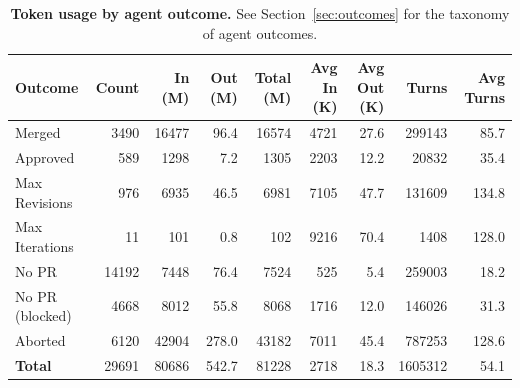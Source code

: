 \begin{table}[tbp]
\centering
\begin{tabular}{lrrrrrrrr}
\toprule
\textbf{Outcome} & \textbf{Count} & \textbf{In (M)} & \textbf{Out (M)} & \textbf{Total (M)} & \textbf{Avg In (K)} & \textbf{Avg Out (K)} & \textbf{Turns} & \textbf{Avg Turns} \\
\midrule
Merged & 3490 & 16477 & 96.4 & 16574 & 4721 & 27.6 & 299143 & 85.7 \\
Approved & 589 & 1298 & 7.2 & 1305 & 2203 & 12.2 & 20832 & 35.4 \\
Max Revisions & 976 & 6935 & 46.5 & 6981 & 7105 & 47.7 & 131609 & 134.8 \\
Max Iterations & 11 & 101 & 0.8 & 102 & 9216 & 70.4 & 1408 & 128.0 \\
No PR & 14192 & 7448 & 76.4 & 7524 & 525 & 5.4 & 259003 & 18.2 \\
No PR (blocked) & 4668 & 8012 & 55.8 & 8068 & 1716 & 12.0 & 146026 & 31.3 \\
Aborted & 6120 & 42904 & 278.0 & 43182 & 7011 & 45.4 & 787253 & 128.6 \\
\midrule
\textbf{Total} & 29691 & 80686 & 542.7 & 81228 & 2718 & 18.3 & 1605312 & 54.1 \\  %
\bottomrule
\end{tabular}
\caption{\textbf{Token usage by agent outcome.} 
See Section~\ref{sec:outcomes} for the taxonomy of agent outcomes.
}
\label{tab:outcome-tokens}
\end{table}











